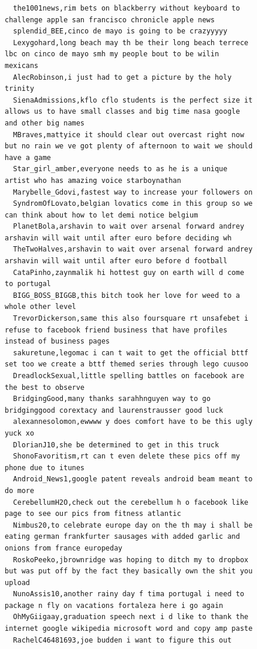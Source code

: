 \begin{figure}[htpb]
\begin{verbatim}
  the1001news,rim bets on blackberry without keyboard to challenge apple san francisco chronicle apple news
  splendid_BEE,cinco de mayo is going to be crazyyyyy
  Lexygohard,long beach may th be their long beach terrece lbc on cinco de mayo smh my people bout to be wilin mexicans
  AlecRobinson,i just had to get a picture by the holy trinity
  SienaAdmissions,kflo cflo students is the perfect size it allows us to have small classes and big time nasa google and other big names
  MBraves,mattyice it should clear out overcast right now but no rain we ve got plenty of afternoon to wait we should have a game
  Star_girl_amber,everyone needs to as he is a unique artist who has amazing voice starboynathan
  Marybelle_Gdovi,fastest way to increase your followers on
  SyndromOfLovato,belgian lovatics come in this group so we can think about how to let demi notice belgium
  PlanetBola,arshavin to wait over arsenal forward andrey arshavin will wait until after euro before deciding wh
  TheTwoHalves,arshavin to wait over arsenal forward andrey arshavin will wait until after euro before d football
  CataPinho,zaynmalik hi hottest guy on earth will d come to portugal
  BIGG_BOSS_BIGGB,this bitch took her love for weed to a whole other level
  TrevorDickerson,same this also foursquare rt unsafebet i refuse to facebook friend business that have profiles instead of business pages
  sakuretune,legomac i can t wait to get the official bttf set too we create a bttf themed series through lego cuusoo
  DreadlockSexual,little spelling battles on facebook are the best to observe
  BridgingGood,many thanks sarahhnguyen way to go bridginggood corextacy and laurenstrausser good luck
  alexannesolomon,ewwww y does comfort have to be this ugly yuck xo
  DlorianJ10,she be determined to get in this truck
  ShonoFavoritism,rt can t even delete these pics off my phone due to itunes
  Android_News1,google patent reveals android beam meant to do more
  CerebellumH2O,check out the cerebellum h o facebook like page to see our pics from fitness atlantic
  Nimbus20,to celebrate europe day on the th may i shall be eating german frankfurter sausages with added garlic and onions from france europeday
  RoskoPeeko,jbrownridge was hoping to ditch my to dropbox but was put off by the fact they basically own the shit you upload
  NunoAssis10,another rainy day f tima portugal i need to package n fly on vacations fortaleza here i go again
  OhMyGiigaay,graduation speech next i d like to thank the internet google wikipedia microsoft word and copy amp paste
  RachelC46481693,joe budden i want to figure this out

\end{verbatim}
\end{figure}
